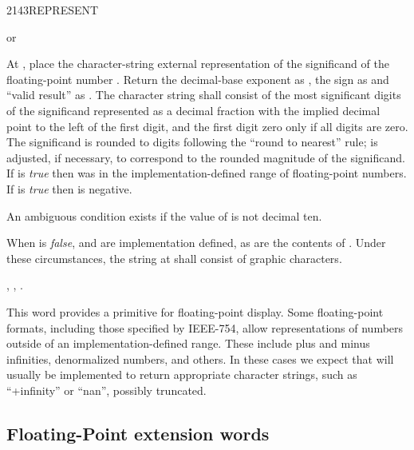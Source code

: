 \begin{worddef}{2143}{REPRESENT}
\item {}  or

	At , place the character-string external
	representation of the significand of the floating-point number
	. Return the decimal-base exponent as , the sign as
	 and ``valid result'' as .
	The character string shall consist of the  most significant
	digits of the significand represented as a decimal fraction with
	the implied decimal point to the left of the first digit, and
	the first digit zero only if all digits are zero. The significand
	is rounded to  digits following the ``round to nearest'' rule;
	 is adjusted, if necessary, to correspond to the rounded
	magnitude of the significand. If  is \emph{true}
	then  was in the implementation-defined range of floating-point
	numbers. If  is \emph{true} then  is negative.

	An ambiguous condition exists if the value of 
	is not decimal ten.

	When  is \emph{false},  and 
	are implementation defined, as are the contents of .
	Under these circumstances, the string at  shall
	consist of graphic characters.

\see {},
	,
	.

	\begin{rationale} %
		This word provides a primitive for floating-point display.
		Some floating-point formats, including those specified by
		IEEE-754, allow representations of numbers outside of an
		implementation-defined range. These include plus and minus
		infinities, denormalized numbers, and others. In these cases
		we expect that  will usually be implemented
		to return appropriate character strings, such as ``+infinity''
		or ``nan'', possibly truncated.
	\end{rationale}
\end{worddef}


\subsection{Floating-Point extension words} %
\extended

